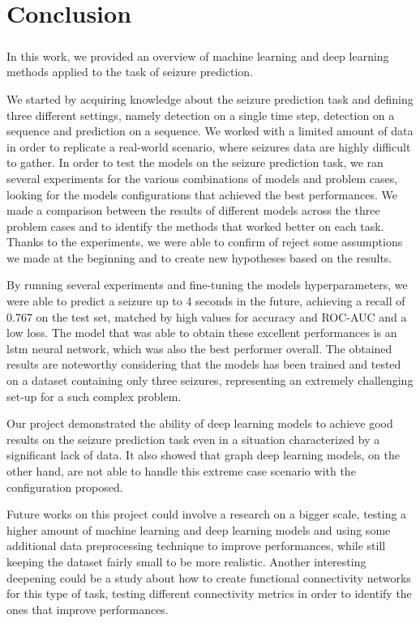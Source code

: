 
\chapter{Conclusion} \label{chap: conclusion}

\paragraph{} In this work, we provided an overview of machine learning and deep learning methods applied to the task of seizure prediction.

We started by acquiring knowledge about the seizure prediction task and defining three different settings, namely detection on a single time step, detection on a sequence and prediction on a sequence. We worked with a limited amount of data in order to replicate a real-world scenario, where seizures data are highly difficult to gather. In order to test the models on the seizure prediction task, we ran several experiments for the various combinations of models and problem cases, looking for the models configurations that achieved the best performances. We made a comparison between the results of different models across the three problem cases and to identify the methods that worked better on each task. Thanks to the experiments, we were able to confirm of reject some assumptions we made at the beginning and to create new hypotheses based on the results.

By running several experiments and fine-tuning the models hyperparameters, we were able to predict a seizure up to 4 seconds in the future, achieving a recall of 0.767 on the test set, matched by high values for accuracy and ROC-AUC and a low loss. The model that was able to obtain these excellent performances is an \acs{lstm} neural network, which was also the best performer overall. The obtained results are noteworthy considering that the models has been trained and tested on a dataset containing only three seizures, representing an extremely challenging set-up for a such complex problem.

Our project demonstrated the ability of deep learning models to achieve good results on the seizure prediction task even in a situation characterized by a significant lack of data. It also showed that graph deep learning models, on the other hand, are not able to handle this extreme case scenario with the configuration proposed.

Future works on this project could involve a research on a bigger scale, testing a higher amount of machine learning and deep learning models and using some additional data preprocessing technique to improve performances, while still keeping the dataset fairly small to be more realistic. Another interesting deepening could be a study about how to create functional connectivity networks for this type of task, testing different connectivity metrics in order to identify the ones that improve performances. 